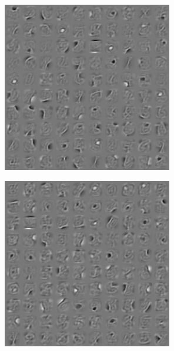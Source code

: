 \documentclass{revtex4-1}
\begin{document}
\begin{figure}
\begin{subfigure}{.25\linewidth}
    \caption{}
    \label{fig:w_tap20_50}
  \end{subfigure}\par\medskip
  \begin{subfigure}{.25\linewidth}
    \includegraphics[width=\linewidth]{features_pcd.png}
    \caption{}
    \label{fig:features_pcd}
  \end{subfigure}
  \begin{subfigure}{.25\linewidth}
    \includegraphics[width=\linewidth]{features_tap.png}

\end{subfigure}
\end{figure}
\end{document}
